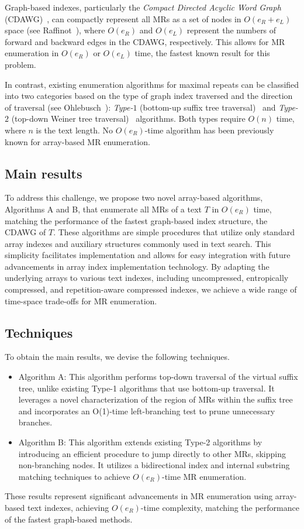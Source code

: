 Graph-based indexes, particularly the \textit{Compact Directed Acyclic Word Graph} (CDAWG)~\cite{blumer1985smallest}, can compactly represent all MRs as a set of nodes in $O(e_R+e_L)$ space (see Raffinot~\cite{raffinot2001maximal}), where $O(e_R)$ and $O(e_L)$ represent the numbers of forward and backward edges in the CDAWG, respectively. This allows for MR enumeration in $O(e_R)$ or $O(e_L)$ time, the fastest known result for this problem.

In contrast, existing enumeration algorithms for maximal repeats can be classified into two categories based on the type of graph index traversed and the direction of traversal (see Ohlebusch~\cite{ohlebusch2013bookbioinfo}): \textit{Type-$1$} (bottom-up suffix tree traversal)~\cite{kasai:lee2001lcp:linear} and \textit{Type-$2$} (top-down Weiner tree traversal)~\cite{abouelhoda2004replacing} algorithms. Both types require $O(n)$ time, where $n$ is the text length. No $O(e_R)$-time algorithm has been previously known for array-based MR enumeration.

\subsection{Main results}

To address this challenge, we propose two novel array-based algorithms, Algorithms A and B, that enumerate all MRs of a text $T$ in $O(e_R)$ time, matching the performance of the fastest graph-based index structure, the CDAWG of $T$.
These algorithms are simple procedures that utilize only standard array indexes and auxiliary structures commonly used in text search. This simplicity facilitates implementation and allows for easy integration with future advancements in array index implementation technology.
By adapting the underlying arrays to various text indexes, including uncompressed, entropically compressed, and repetition-aware compressed indexes, we achieve a wide range of time-space trade-offs for MR enumeration.

\subsection{Techniques}

To obtain the main results, we devise the following techniques. 
\begin{itemize}
\item 
Algorithm A: This algorithm performs top-down traversal of the virtual suffix tree, unlike existing Type-1 algorithms that use bottom-up traversal. It leverages a novel characterization of the region of MRs within the suffix tree and incorporates an O(1)-time left-branching test to prune unnecessary branches.

\item 
Algorithm B: This algorithm extends existing Type-2 algorithms by introducing an efficient procedure to jump directly to other MRs, skipping non-branching nodes. It utilizes a bidirectional index and internal substring matching techniques to achieve $O(e_R)$-time MR enumeration.
\end{itemize}

These results represent significant advancements in MR enumeration using array-based text indexes, achieving $O(e_R)$-time complexity, matching the performance of the fastest graph-based methods.